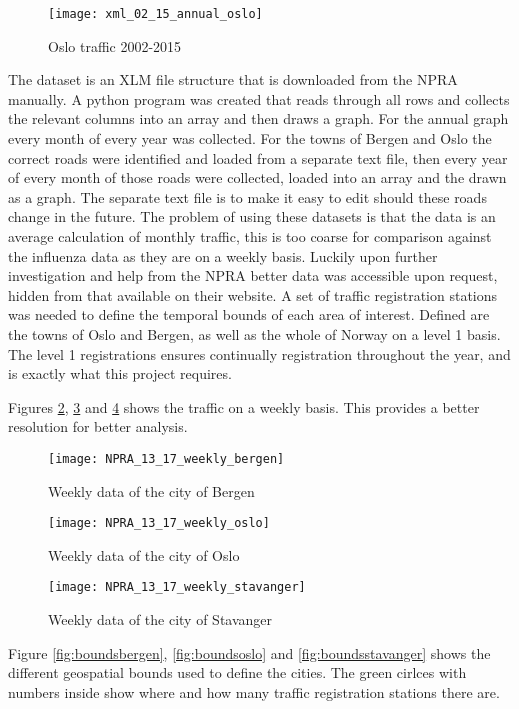\begin{figure}[ht]
\texttt{[image: xml\_02\_15\_annual\_oslo]}
\centering
\caption{Oslo traffic 2002-2015}
\label{fig:anualoslo}
\end{figure}
The dataset is an XLM file structure that is downloaded from the NPRA manually. A python program was created that reads through all rows and collects the relevant columns into an array and then draws a graph. For the annual graph every month of every year was collected. For the towns of Bergen and Oslo the correct roads were identified and loaded from a separate text file, then every year of every month of those roads were collected, loaded into an array and the drawn as a graph. The separate text file is to make it easy to edit should these roads change in the future.
The problem of using these datasets is that the data is an average calculation of monthly traffic, this is too coarse for comparison against the influenza data as they are on a weekly basis. Luckily upon further investigation and help from the NPRA better data was accessible upon request, hidden from that available on their website. A set of traffic registration stations was needed to define the temporal bounds of each area of interest. Defined are the towns of Oslo and Bergen, as well as the whole of Norway on a level 1 basis. The level 1 registrations ensures continually registration throughout the year, and is exactly what this project requires.

Figures \ref{fig:weeklybergen}, \ref{fig:weeklyoslo} and \ref{fig:weeklystavanger} shows the traffic on a weekly basis. This provides a better resolution for better analysis.
\begin{figure}[ht]
\texttt{[image: NPRA\_13\_17\_weekly\_bergen]}
\centering
\caption{Weekly data of the city of Bergen}
\label{fig:weeklybergen}
\end{figure}

\begin{figure}[ht]
\texttt{[image: NPRA\_13\_17\_weekly\_oslo]}
\centering
\caption{Weekly data of the city of Oslo}
\label{fig:weeklyoslo}
\end{figure}

\begin{figure}[ht]
\texttt{[image: NPRA\_13\_17\_weekly\_stavanger]}
\centering
\caption{Weekly data of the city of Stavanger}
\label{fig:weeklystavanger}
\end{figure}

Figure \ref{fig:boundsbergen}, \ref{fig:boundsoslo} and \ref{fig:boundsstavanger} shows the different geospatial bounds used to define the cities. The green cirlces with numbers inside show where and how many traffic registration stations there are.


